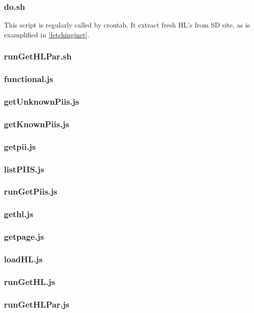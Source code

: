 \documentclass[a4paper,11pt]{report}
\begin{document}
\subsubsection{do.sh}
This script is regularly called by crontab. It extract fresh HL's from SD site, as is examplified in \ref{fetchinginet}.


\subsubsection{runGetHLPar.sh}
\subsubsection{functional.js}
\subsubsection{getUnknownPiis.js}
\subsubsection{getKnownPiis.js}
\subsubsection{getpii.js}
\subsubsection{listPIIS.js}
\subsubsection{runGetPiis.js}
\subsubsection{gethl.js}
\subsubsection{getpage.js}
\subsubsection{loadHL.js}
\subsubsection{runGetHL.js}
\subsubsection{runGetHLPar.js}
\end{document}
